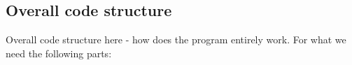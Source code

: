 \documentclass[../report.tex]{subfiles}
\begin{document}
\subsection{Overall code structure}
Overall code structure here - how does the program entirely work. For what we need
the following parts:
\end{document}
